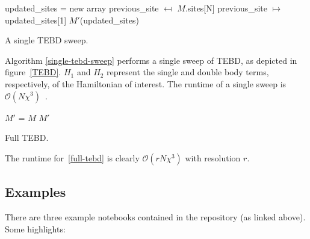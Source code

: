 \documentclass[12pt]{article}
\begin{document}
\begin{multicols}{2}
	\begin{algorithm}[H]
		updated\_sites = new array\;
		previous\_site $\mapsfrom$ $M$.sites[N]\;
		previous\_site $\mapsto$ updated\_sites[1]\;
		\Return $M'$(updated\_sites)\;
		\caption{A single TEBD sweep.}
		\label{single-tebd-sweep}
	\end{algorithm}
	Algorithm \ref{single-tebd-sweep} performs a single sweep of TEBD, as depicted in figure~\ref{TEBD}. $H_1$ and $H_2$ represent the single and double body terms, respectively, of the Hamiltonian of interest. The runtime of a single sweep is $\mathcal{O}(N\chi^3)$~\cite{Vidal}.
	\begin{algorithm}[H]
		$M'$ = $M$\;
		\Return $M'$\;
		\caption{Full TEBD.}
		\label{full-tebd}
	\end{algorithm}
	The runtime for~\ref{full-tebd} is clearly $\mathcal{O}(rN\chi^3)$ with resolution $r$.
	\subsection{Examples}
	There are three example notebooks contained in the repository (as
	linked above). Some highlights:


\end{multicols}
\end{document}
